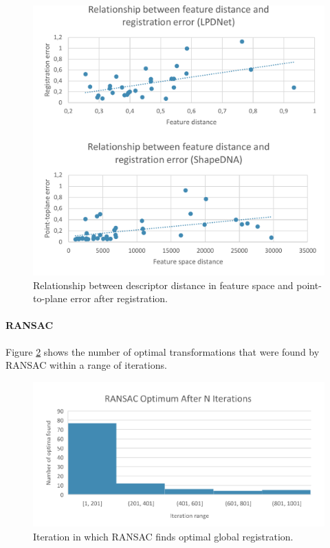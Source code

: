 \begin{figure}[h]
    \centering
    \includegraphics*[width=\textwidth]{./fig/registration_charts.pdf}
    \caption{Relationship between descriptor distance in feature space and point-to-plane error after registration.}
    \label{fig:lpdnet_registration}
\end{figure}

\paragraph{RANSAC}
Figure \ref{fig:ransac_results} shows the number of optimal transformations that were found by RANSAC within a range of iterations. 

\begin{figure}[h]
    \centering
    \includegraphics*[width=\textwidth]{./fig/ransac_optima.png}
    \caption{Iteration in which RANSAC finds optimal global registration.}
    \label{fig:ransac_results}
\end{figure}

